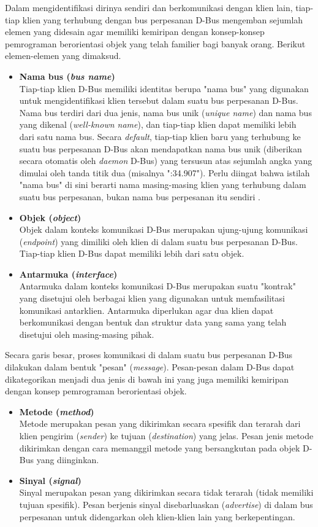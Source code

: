 Dalam mengidentifikasi dirinya sendiri dan berkomunikasi dengan klien lain, tiap-tiap klien yang terhubung dengan bus perpesanan D-Bus mengemban sejumlah elemen yang didesain agar memiliki kemiripan dengan konsep-konsep pemrograman berorientasi objek yang telah familier bagi banyak orang. Berikut elemen-elemen yang dimaksud.
\begin{itemize}
    \item \textbf{Nama bus (\textit{bus name})}\\
    Tiap-tiap klien D-Bus memiliki identitas berupa "nama bus" yang digunakan untuk mengidentifikasi klien tersebut dalam suatu bus perpesanan D-Bus. Nama bus terdiri dari dua jenis, nama bus unik (\textit{unique name}) dan nama bus yang dikenal (\textit{well-known name}), dan tiap-tiap klien dapat memiliki lebih dari satu nama bus. Secara \textit{default}, tiap-tiap klien baru yang terhubung ke suatu bus perpesanan D-Bus akan mendapatkan nama bus unik (diberikan secara otomatis oleh \textit{daemon} D-Bus) yang tersusun atas sejumlah angka yang dimulai oleh tanda titik dua (misalnya ":34.907"). Perlu diingat bahwa istilah "nama bus" di sini berarti nama masing-masing klien yang terhubung dalam suatu bus perpesanan, bukan nama bus perpesanan itu sendiri \cite{official-introduction-to-dbus}.
    \item \textbf{Objek (\textit{object})}\\
    Objek dalam konteks komunikasi D-Bus merupakan ujung-ujung komunikasi (\textit{endpoint}) yang dimiliki oleh klien di dalam suatu bus perpesanan D-Bus. Tiap-tiap klien D-Bus dapat memiliki lebih dari satu objek.
    \item \textbf{Antarmuka (\textit{interface})}\\
    Antarmuka dalam konteks komunikasi D-Bus merupakan suatu "kontrak" yang disetujui oleh berbagai klien yang digunakan untuk memfasilitasi komunikasi antarklien. Antarmuka diperlukan agar dua klien dapat berkomunikasi dengan bentuk dan struktur data yang sama yang telah disetujui oleh masing-masing pihak.
\end{itemize}

Secara garis besar, proses komunikasi di dalam suatu bus perpesanan D-Bus dilakukan dalam bentuk "pesan" (\textit{message}). Pesan-pesan dalam D-Bus dapat dikategorikan menjadi dua jenis di bawah ini yang juga memiliki kemiripan dengan konsep pemrograman berorientasi objek.
\begin{itemize}
    \item \textbf{Metode (\textit{method})}\\
    Metode merupakan pesan yang dikirimkan secara spesifik dan terarah dari klien pengirim (\textit{sender}) ke tujuan (\textit{destination}) yang jelas. Pesan jenis metode dikirimkan dengan cara memanggil metode yang bersangkutan pada objek D-Bus yang diinginkan.
    \item \textbf{Sinyal (\textit{signal})}\\
    Sinyal merupakan pesan yang dikirimkan secara tidak terarah (tidak memiliki tujuan spesifik). Pesan berjenis sinyal disebarluaskan (\textit{advertise}) di dalam bus perpesanan untuk didengarkan oleh klien-klien lain yang berkepentingan.
\end{itemize}

